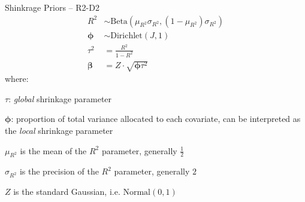 \begin{frame}{Shinkrage Priors -- R2-D2}
    $$
    \begin{aligned}
        R^2 &\sim \text{Beta} \left( \mu_{R^2} \sigma_{R^2}, (1 - \mu_{R^2}) \sigma_{R^2} \right) \\
        \boldsymbol{\phi} &\sim \text{Dirichlet}(J, 1) \\
        \tau^2 &= \frac{R^2}{1 - R^2} \\
        \boldsymbol{\beta} &= Z \cdot \sqrt{\boldsymbol{\phi} \tau^2}
    \end{aligned}
    $$
    where:
    \begin{vfilleditems}
        \small
        \item $\tau$: \textit{global} shrinkage parameter
        \item $\boldsymbol{\phi}$: proportion of total variance allocated to each covariate,
            can be interpreted as the \textit{local} shrinkage parameter
        \item $\mu_{R^2}$ is the mean of the $R^2$ parameter, generally $\frac{1}{2}$
        \item $\sigma_{R^2}$ is the precision of the $R^2$ parameter, generally $2$
        \item $Z$ is the standard Gaussian, i.e. $\text{Normal}(0, 1)$
    \end{vfilleditems}
\end{frame}

